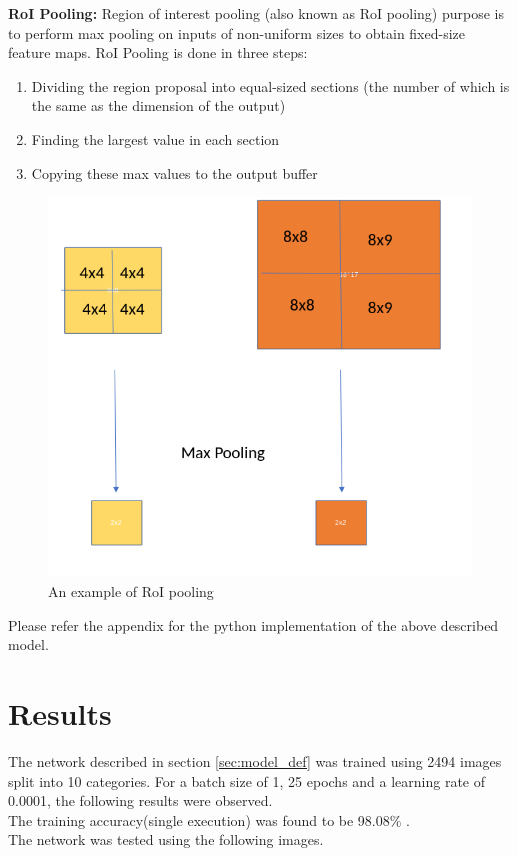 \documentclass[12pt]{article}
\begin{document}
\textbf{RoI Pooling: } Region of interest pooling (also known as RoI pooling) purpose is to perform max pooling on inputs of non-uniform sizes to obtain fixed-size feature maps. RoI Pooling is done in three steps:
\begin{enumerate}
	\item Dividing the region proposal into equal-sized sections (the number of which is the same as the dimension of the output)
	
	\item Finding the largest value in each section
	
	\item Copying these max values to the output buffer

\end{enumerate}

\begin{figure}[H]
\centering
  \includegraphics[width=0.5\linewidth]{./Images/ROIPool.png}
  \caption{An example of RoI pooling}
  \label{fig:ROIPool}
\end{figure}


Please refer the appendix for the python implementation of the above described model. 
\newpage

\section{Results}
The network described in section \ref{sec:model_def} was trained using 2494 images split into 10 categories. For a batch size of 1, 25 epochs and a learning rate of 0.0001, the following results were observed. \\

\noindent
The training accuracy(single execution) was found to be 98.08\% . \\

\noindent
The network was tested using the following images. \\
\end{document}
